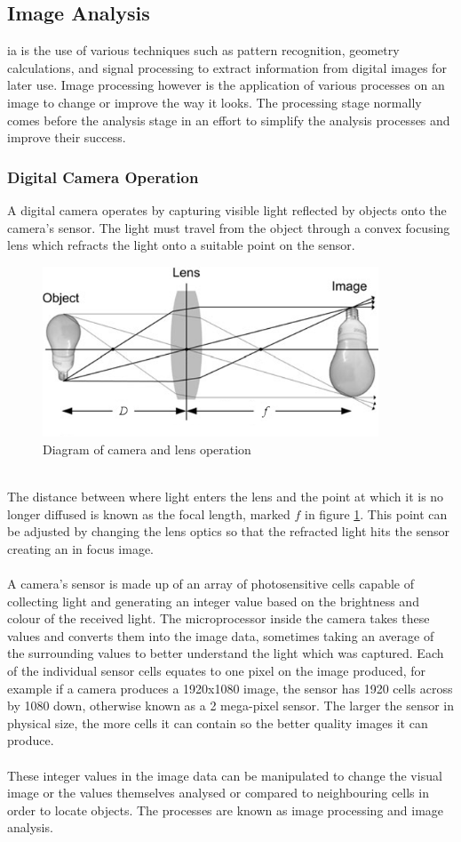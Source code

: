 \subsection{Image Analysis}
	\gls{ia} is the use of various techniques such as pattern recognition, 
	geometry calculations, and signal processing to extract information from 
	digital images for later use. Image processing however is the application 
	of various processes on an image to change or improve the way it looks. The 
	processing stage normally comes before the analysis stage in an effort to 
	simplify the analysis processes and improve their success.
	\subsubsection{Digital Camera Operation}
	A digital camera operates by capturing visible light reflected by objects 
	onto the camera's sensor. The light must travel from the object through a convex focusing lens 
	which refracts the light onto a suitable point on the sensor.
	\begin{figure}[h!]
		\centering
		\includegraphics[width=10cm]{../images/camera_bulb.PNG}
		\caption{Diagram of camera and lens operation}
		\label{fig:camera_diagram}
	\end{figure}
	\\
	The distance between where light enters the lens and the point at which it is no longer 
	diffused is known as the focal length, marked $f$ in figure \ref{fig:camera_diagram}. This 
	point can be adjusted by changing the lens optics so that the refracted 
	light hits the sensor creating an in focus image.
	\\\\
	A camera's sensor is made up of an array of photosensitive cells capable of collecting light and generating an integer value based on the brightness and colour of the received light. The microprocessor inside the camera takes these values and converts them into the image data, sometimes taking an average of the surrounding values to better understand the light which was captured. Each of the individual sensor cells equates to one pixel on the image produced, for 
	example if a camera produces a 1920x1080 image, the sensor has 1920 cells across by 1080 down, otherwise known as a 2 mega-pixel sensor. The larger the sensor in physical size, the more cells it can contain so the better quality images it can produce.
	\\\\
	These integer values in the image data can be manipulated to change the 
	visual image or the values themselves analysed or compared to neighbouring 
	cells in order to locate objects. The processes are known as image processing and image analysis.
